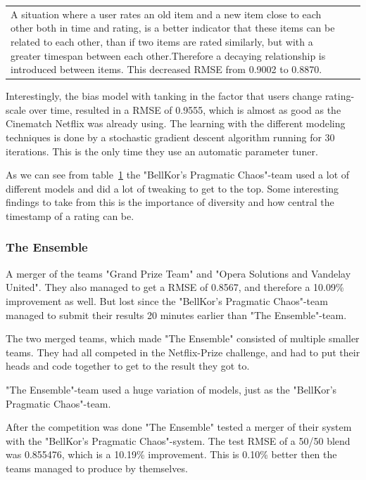\begin{table}[H]
\begin{tabular}{ p{3.2cm} p{9cm} }
  A situation where a user rates an old item and a new item close to each other both in time and rating, is a better indicator that these items can be related to each other, than if two items are rated similarly, but with a greater timespan between each other.Therefore a decaying relationship is introduced between items. This decreased RMSE from 0.9002 to 0.8870.\cite{BellKor-CF-TD} \\
\end{tabular}
\label{table:bellkor-models}
\end{table}

Interestingly, the bias model with tanking in the factor that users change rating-scale over time, resulted in a RMSE of 0.9555, which is almost as good as the Cinematch Netflix was already using. The learning with the different modeling techniques is done by a stochastic gradient descent algorithm running for 30 iterations. This is the only time they use an automatic parameter tuner. \cite{BellKor-2008-sol}

As we can see from table~\ref{table:bellkor-models} the "BellKor's Pragmatic Chaos"-team used a lot of different models and did a lot of tweaking to get to the top. Some interesting findings to take from this is the importance of diversity and how central the timestamp of a rating can be.

\subsubsection{The Ensemble}

A merger of the teams "Grand Prize Team" and "Opera Solutions and Vandelay United". They also managed to get a RMSE of 0.8567, and therefore a 10.09\% improvement as well. But lost since the "BellKor's Pragmatic Chaos"-team managed to submit their results 20 minutes earlier than "The Ensemble"-team.

The two merged teams, which made "The Ensemble" consisted of multiple smaller teams. They had all competed in the Netflix-Prize challenge, and had to put their heads and code together to get to the result they got to.

"The Ensemble"-team used a huge variation of models, just as the "BellKor's Pragmatic Chaos"-team.

After the competition was done "The Ensemble" tested a merger of their system with the "BellKor's Pragmatic Chaos"-system. The test RMSE of a 50/50 blend was 0.855476, which is a 10.19\% improvement. This is 0.10\% better then the teams managed to produce by themselves.

